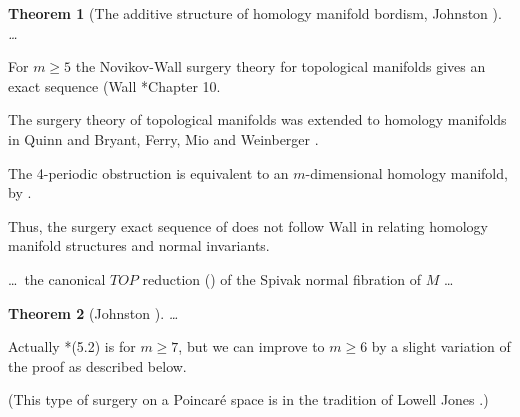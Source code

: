\documentclass{amsart}
\newenvironment{dual}{%
  \par\medskip
  \trivlist\item[]%
}{%
  \endtrivlist
}
\newcommand{\backup}{%
  \vspace*{-\baselineskip}\vspace*{-\medskipamount}\nopagebreak
}
\newtheorem{thm}{Theorem}[section]
\begin{document}
\begin{dual}\backup
\begin{thm}[The additive structure of
  homology manifold bordism, Johnston
  \cite{Jo}]
\dots
\end{thm}
\end{dual}

\begin{dual}
For $m\geq 5$ the Novikov-Wall surgery theory
for topological manifolds gives an exact
sequence (Wall \cite{Wa}*{Chapter 10}.
\end{dual}

\begin{dual}
The surgery theory of topological manifolds
was extended to homology manifolds in Quinn
\cites{Q1,Q2} and Bryant, Ferry, Mio
and Weinberger \cite{BFMW}.
\end{dual}

\begin{dual}
The 4-periodic obstruction is equivalent to
an $m$-dimensional homology manifold, by
\cite{BFMW}.
\end{dual}

\begin{dual}
Thus, the surgery exact sequence of
\cite{BFMW} does not follow Wall \cite{Wa} in
relating homology manifold structures and
normal invariants.
\end{dual}

\begin{dual}
\dots\ the canonical $TOP$ reduction
(\cite{FP}) of the Spivak normal fibration of
$M$ \dots
\end{dual}

\begin{dual}\backup
\begin{thm}[Johnston \cite{Jo}]
\dots
\end{thm}
\end{dual}

\begin{dual}
Actually \cite{Jo}*{(5.2)} is for $m\geq 7$,
but we can improve to $m\geq 6$ by a slight
variation of the proof as described below.
\end{dual}

\begin{dual}
(This type of surgery on a Poincar\'e space
is in the tradition of Lowell Jones
\cite{Jn}.)
\end{dual}



\end{document}
